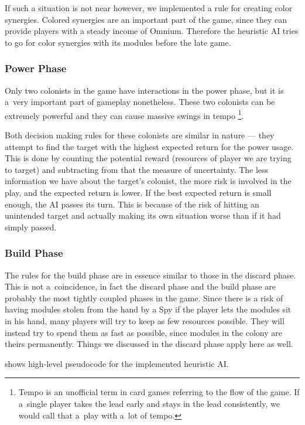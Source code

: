 If such a situation is not near however, we implemented a rule for creating color
synergies. Colored synergies are an important part of the game, since they
can provide players with a steady income of Omnium. Therefore the heuristic AI
tries to go for color synergies with its modules before the late game.

\subsubsection{Power Phase}

Only two colonists in the game have interactions in the power phase, but
it is a~very important part of gameplay nonetheless. These two colonists
can be extremely powerful and they can cause massive swings in tempo
\footnote{Tempo is an unofficial term in card games referring to the flow of the game.
If a~single player takes the lead early and stays in the lead consistently, we would
call that a~play with a~lot of tempo.}.

Both decision making rules for these colonists are similar in nature --- they attempt
to find the target with the highest expected return for the power usage.
This is done by counting the potential reward (resources of player we are trying
to target) and subtracting from that the measure of uncertainty. The less information
we have about the target's colonist, the more risk is involved in the play, and the
expected return is lower. If the best
expected return is small enough, the AI passes its turn. This is because of the risk
of hitting an unintended target and actually making its own situation worse than if
it had simply passed.

\subsubsection{Build Phase}

The rules for the build phase are in essence similar to those in the discard phase.
This is not a~coincidence, in fact the discard phase and the build phase
are probably the most tightly coupled phases in the game. Since there is a risk of
having modules stolen from the hand by a Spy if the player lets the modules
sit in his hand, many players will try to keep as few resources possible.
They will instead try to spend them as fast as possible, since modules in the colony
are theirs permanently. Things we discussed in the discard phase apply here as well.

 shows high-level pseudocode for
the implemented heuristic AI.


